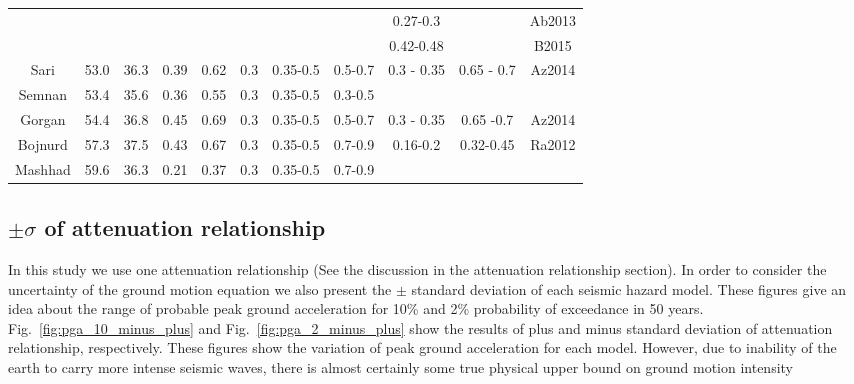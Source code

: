\begin{table*}[!ht]
\begin{tabular}{ | c | c | c | c | c | c | c | c | c | c | c |}
	 \cline{9-11}	             &  &  &  &  &  &  & & 0.27-0.3  &  & Ab2013\\ 
	 \cline{9-11}	             &  &  &  &  &  &  & & 0.42-0.48 &  & B2015\\ \hline
	 Sari          & 53.0   & 36.3   & 0.39   & 0.62  & 0.3 & 0.35-0.5 &0.5-0.7& 0.3 - 0.35 &  0.65 - 0.7 & Az2014\\ \hline
	 Semnan   & 53.4   & 35.6   & 0.36   & 0.55  & 0.3 & 0.35-0.5 &0.3-0.5&  & & \\ \hline
	 Gorgan    & 54.4   & 36.8    & 0.45  & 0.69  & 0.3 & 0.35-0.5 &0.5-0.7& 0.3 - 0.35 &  0.65 -0.7 & Az2014\\ \hline
	 Bojnurd   & 57.3    & 37.5    & 0.43  & 0.67  & 0.3 & 0.35-0.5 &0.7-0.9&0.16-0.2  & 0.32-0.45  & Ra2012  \\ \hline
	 Mashhad & 59.6     & 36.3   & 0.21 & 0.37  & 0.3 & 0.35-0.5 &0.7-0.9  &  &&  \\ \hline
 
\end{tabular}
\label{tab:pga_values}
\end{table*}



\subsection{$\pm \sigma$ of attenuation relationship}
In this study we use one attenuation relationship (See the discussion in the attenuation relationship section). In order to consider the uncertainty of the ground motion equation we also present the $\pm$ standard deviation of each seismic hazard model. These figures give an idea about the range of probable peak ground acceleration for 10\% and 2\% probability of exceedance in 50 years. Fig.~\ref{fig:pga_10_minus_plus} and Fig.~\ref{fig:pga_2_minus_plus} show the results of plus and minus standard deviation of attenuation relationship, respectively. These figures show the variation of peak ground acceleration for each model. However, due to inability of the earth to carry more intense seismic waves, there is almost certainly some true physical upper bound on ground motion intensity \citep{Baker2008}




